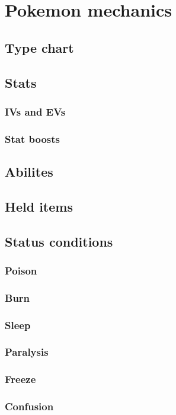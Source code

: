 \section{Pokemon mechanics}
\label{sec:pokemon-mechanics}

\subsection{Type chart}
\subsection{Stats}
\subsubsection{IVs and EVs}
\subsubsection{Stat boosts}
\subsection{Abilites}
\subsection{Held items}
\subsection{Status conditions}
\subsubsection{Poison}
\subsubsection{Burn}
\subsubsection{Sleep}
\subsubsection{Paralysis}
\subsubsection{Freeze}
\subsubsection{Confusion}
